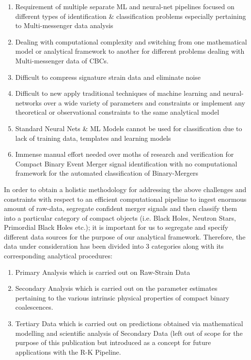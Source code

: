     \begin{enumerate}
    
        \item {Requirement of multiple separate ML and neural-net pipelines focused on different types of identification \& classification problems especially pertaining to Multi-messenger data analysis }
        \item {Dealing with computational complexity and  switching from one mathematical model or analytical framework to another for different problems dealing with Multi-messenger data of CBCs.}
        \item {Difficult to compress signature strain data and eliminate noise}
        \item {Difficult to new apply traditional techniques of machine learning and neural-networks over a wide variety of parameters and constraints or implement any theoretical or observational constraints to the same analytical model}
        \item {Standard Neural Nets \& ML Models cannot be used for classification due to lack of training data, templates and learning models}
        \item {Immense manual effort needed over moths of research and verification for Compact Binary Event Merger signal identification with no computational framework for the automated classification of Binary-Mergers}
        
    \end{enumerate}

    In order to obtain a holistic methodology for addressing the above challenges and constraints with respect to an efficient computational pipeline to ingest enormous amount of raw-data, segregate confident merger signals and then classify them into a particular category of compact objects (i.e. Black Holes, Neutron Stars, Primordial Black Holes etc.); it is important for us to segregate and specify different data sources for the purpose of our analytical framework. Therefore, the data under consideration has been divided into 3 categories along with its corresponding analytical procedures:
    \begin{enumerate}
        \item Primary Analysis which is carried out on Raw-Strain Data
        \item Secondary Analysis which is carried out on the parameter estimates pertaining to the various  intrinsic physical properties of compact binary coalescences.
        \item Tertiary Data which is carried out on predictions obtained via mathematical modelling and scientific analysis of Secondary Data (left out of scope for the purpose of this publication but introduced as a concept for future applications with the R-K Pipeline.
        
    \end{enumerate}

